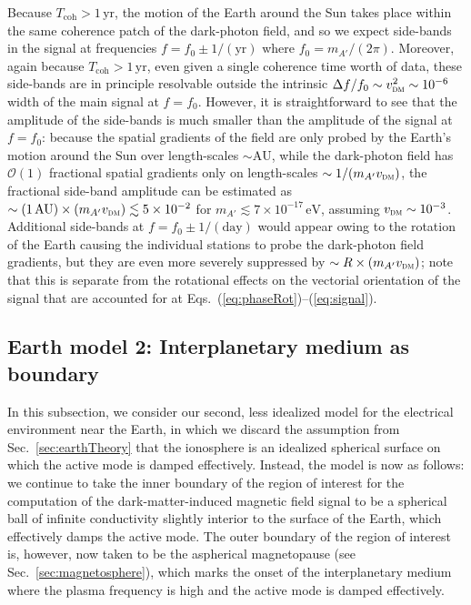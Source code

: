 \documentclass[amsmath,amssymb,aps,10pt,prd,letterpaper,nofootinbib,balancelastpage,notitlepage,superscriptaddress,twocolumn,floatfix]{revtex4-2}
\newcommand{\secref}[2][]{Sec{#1}.~\ref{#2}}		%
\newcommand{\eqrefRange}[2]{Eqs.~(\ref{eq:#1})--(\ref{eq:#2})}
\begin{document}
Because $T_{\text{coh}} > 1\,\text{yr}$, the motion of the Earth around the Sun takes place within the same coherence patch of the dark-photon field, and so we expect side-bands in the signal at frequencies $f = f_0 \pm 1/(\text{yr})$ where $f_0 = m_{A'}/(2\pi)$. 
Moreover, again because $T_{\text{coh}}>1\,\text{yr}$, even given a single coherence time worth of data, these side-bands are in principle resolvable outside the intrinsic $\Delta f / f_0 \sim v_{\textsc{dm}}^2 \sim 10^{-6}$ width of the main signal at $f=f_0$.
However, it is straightforward to see that the amplitude of the side-bands is much smaller than the amplitude of the signal at $f=f_0$: because the spatial gradients of the field are only probed by the Earth's motion around the Sun over length-scales $\sim \text{AU}$, while the dark-photon field has $\mathcal{O}(1)$ fractional spatial gradients only on length-scales $\sim 1 / (m_{A'} v_{\textsc{dm}})$, the fractional side-band amplitude can be estimated as $\sim ( 1\,\text{AU} ) \times (m_{A'} v_{\textsc{dm}}) \lesssim 5\times 10^{-2}$ for $m_{A'}\lesssim 7\times 10^{-17}\,\text{eV}$, assuming $v_{\textsc{dm}}\sim10^{-3}$.
Additional side-bands at $f = f_0 \pm 1/(\text{day})$ would appear owing to the rotation of the Earth causing the individual stations to probe the dark-photon field gradients, but they are even more severely suppressed by $\sim R\times (m_{A'}v_{\textsc{dm}})$; note that this is separate from the rotational effects on the vectorial orientation of the signal that are accounted for at \eqrefRange{phaseRot}{signal}.


\subsection{Earth model 2: Interplanetary medium as boundary}
\label{sec:generalEarthTheory}

In this subsection, we consider our second, less idealized model for the electrical environment near the Earth, in which we discard the assumption from \secref{sec:earthTheory} that the ionosphere is an idealized spherical surface on which the active mode is damped effectively.
Instead, the model is now as follows:
we continue to take the inner boundary of the region of interest for the computation of the dark-matter-induced magnetic field signal to be a spherical ball of infinite conductivity slightly interior to the surface of the Earth, which effectively damps the active mode.
The outer boundary of the region of interest is, however, now taken to be the aspherical magnetopause (see \secref{sec:magnetosphere}), which marks the onset of the interplanetary medium where the plasma frequency is high and the active mode is damped effectively.
\end{document}

